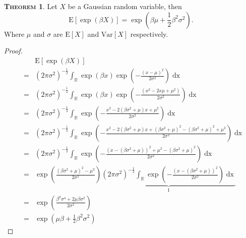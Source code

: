 \documentclass[a4paper, twoside, 11pt]{article}
\theoremstyle{definition}
\newtheorem{theorem}[definition]{\scshape Theorem}
\newcommand{\brkt}[1]{\left({#1} \right)}
\begin{document}
\begin{theorem}
  Let $X$ be a Gaussian random variable, then
  \begin{equation}
	\mathrm{E}[\exp(\beta X)] = \exp(\beta\mu + \frac{1}{2}\beta^2\sigma^2).
	\label{sec:expgau}
  \end{equation}
  Where $\mu$ and $\sigma$ are $\mathrm{E}[X]$ and $\mathrm{Var}[X]$ respectively.
\end{theorem}
\begin{proof}
\begin{eqnarray*}
  &&\mathrm{E}[\exp(\beta X)] \\
&=& (2\pi \sigma^2)^{-\frac{1}{2}}\int_\mathbb{R} \exp(\beta x) \exp\brkt{-\frac{(x-\mu)^2}{2\sigma^2}} \mathop{dx}\\
&=& (2\pi \sigma^2)^{-\frac{1}{2}}\int_\mathbb{R} \exp(\beta x) \exp\brkt{-\frac{(x^2- 2x\mu+ \mu^2)}{2\sigma^2}} \mathop{dx}\\
&=& (2\pi \sigma^2)^{-\frac{1}{2}}\int_\mathbb{R} \exp\brkt{-\frac{x^2- 2(\beta\sigma^2+\mu)x+ \mu^2}{2\sigma^2}} \mathop{dx}\\
&=& (2\pi \sigma^2)^{-\frac{1}{2}}\int_\mathbb{R} \exp\brkt{-\frac{x^2- 2(\beta\sigma^2+\mu)x+ (\beta\sigma^2+\mu)^2 -  (\beta\sigma^2+\mu)^2 + \mu^2}{2\sigma^2}} \mathop{dx}\\
&=& (2\pi \sigma^2)^{-\frac{1}{2}}\int_\mathbb{R} \exp\brkt{-\frac{(x- (\beta\sigma^2+\mu))^2+ \mu^2 - (\beta\sigma^2+\mu)^2}{2\sigma^2}} \mathop{dx}\\
&=& \exp\brkt{\frac{(\beta\sigma^2+\mu)^2 - \mu^2}{2\sigma^2}} \underbrace{(2\pi \sigma^2)^{-\frac{1}{2}}\int_\mathbb{R} \exp\brkt{-\frac{(x- (\beta\sigma^2+\mu))^2}{2\sigma^2}}\mathop{dx}}_{1}\\
&=& \exp\brkt{\frac{\beta^2\sigma^4 + 2\mu\beta\sigma^2}{2\sigma^2}}\\
&=& \exp(\mu\beta + \frac{1}{2}\beta^2\sigma^2)
\end{eqnarray*}
\end{proof}
\end{document}

